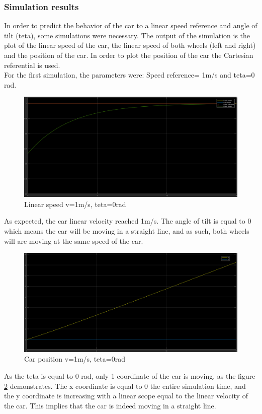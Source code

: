 \subsubsection{Simulation results}

In order to predict the behavior of the car to a linear speed reference and angle of tilt (teta), some simulations were necessary. The output of the simulation is the plot of the linear speed of the car, the linear speed of both wheels (left and right) and the position of the car.
In order to plot the position of the car the Cartesian referential is used.\\
For the first simulation, the parameters were: Speed reference= 1m/s and teta=0 rad.\\

\begin{figure}[!ht]
\centering
\includegraphics[width=1.0\textwidth]{./img/vel10.PNG}
\caption {\label{fig:sim1 - vel}Linear speed v=1m/s, teta=0rad}
\end{figure}
 As expected, the car linear velocity reached 1m/s. The angle of tilt is equal to 0 which means the car will be moving in a straight line, and as such, both wheels will are moving at the same speed of the car.\\
\newpage
\begin{figure}[!ht]
\centering
\includegraphics[width=1.0\textwidth]{./img/xy10.PNG}
\caption {\label{fig:sim1 - pos}Car position v=1m/s, teta=0rad}
\end{figure}
As the teta is equal to 0 rad, only 1 coordinate of the car is moving, as the figure \ref{fig:sim1 - pos} demonstrates. The x coordinate is equal to 0 the entire simulation time, and the y coordinate is increasing with a linear scope equal to the linear velocity of the car. This implies that the car is indeed moving in a straight line.\\

